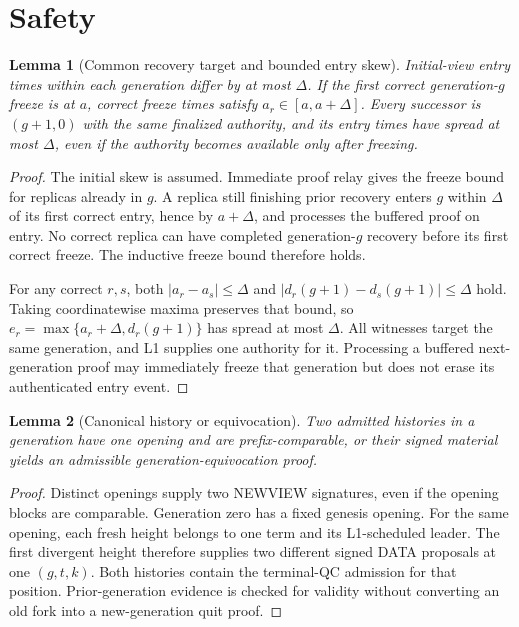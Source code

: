 \documentclass[11pt,a4paper]{article}
\newtheorem{lemma}[lemma]{Lemma}
\begin{document}
\section{Safety}
\label{sec:safety}
\begin{lemma}[Common recovery target and bounded entry skew]
\label{lem:entry}
Initial-view entry times within each generation differ by at most
$\Delta$. If the first correct generation-$g$ freeze is at $a$, correct
freeze times satisfy $a_r\in[a,a+\Delta]$. Every successor is $(g+1,0)$
with the same finalized authority, and its entry times have spread at most
$\Delta$, even if the authority becomes available only after freezing.
\end{lemma}
\begin{proof}
The initial skew is assumed. Immediate proof relay gives the freeze
bound for replicas already in $g$. A replica still finishing prior recovery
enters $g$ within $\Delta$ of its first correct entry, hence by
$a+\Delta$, and processes the buffered proof on entry. No correct replica
can have completed generation-$g$ recovery before its first correct freeze.
The inductive freeze bound therefore holds.

For any correct $r,s$, both
$|a_r-a_s|\le\Delta$ and $|d_r(g+1)-d_s(g+1)|\le\Delta$ hold.
Taking coordinatewise maxima preserves that bound, so
$e_r=\max\{a_r+\Delta,d_r(g+1)\}$ has spread at most $\Delta$.
All witnesses target the same generation, and L1 supplies one authority
for it. Processing a buffered next-generation proof may immediately
freeze that generation but does not erase its authenticated entry event.
\end{proof}

\begin{lemma}[Canonical history or equivocation]
\label{lem:fork}
Two admitted histories in a generation have one opening and are
prefix-comparable, or their signed material yields an admissible
generation-equivocation proof.
\end{lemma}
\begin{proof}
Distinct openings supply two NEWVIEW signatures, even if the opening
blocks are comparable. Generation zero has a fixed genesis opening.
For the same opening, each fresh height belongs to one term and its
L1-scheduled leader. The first divergent height therefore supplies two
different signed DATA proposals at one $(g,t,k)$. Both histories contain
the terminal-QC admission for that position. Prior-generation evidence
is checked for validity without converting an old fork into a new-generation
quit proof.
\end{proof}
\end{document}
